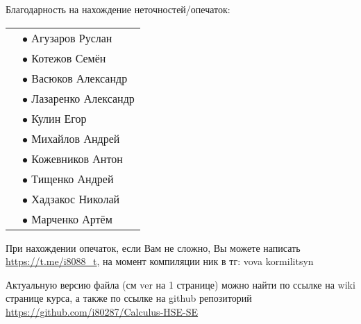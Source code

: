 Благодарность на нахождение неточностей/опечаток:

\begin{tabular}{rl}
    & $\bullet$ Агузаров Руслан \\
    & $\bullet$ Котежов Семён \\
    & $\bullet$ Васюков Александр \\
    & $\bullet$ Лазаренко Александр \\
    & $\bullet$ Кулин Егор \\
    & $\bullet$ Михайлов Андрей \\
    & $\bullet$ Кожевников Антон \\
    & $\bullet$ Тищенко Андрей \\
    & $\bullet$ Хадзакос Николай \\
    & $\bullet$ Марченко Артём \\
\end{tabular}

При нахождении опечаток, если Вам не сложно, Вы можете написать \url{https://t.me/i8088_t}, на момент компиляции ник в тг: vova kormilitsyn

Актуальную версию файла (см ver на 1 странице) можно найти по ссылке на wiki странице курса, 
а также по ссылке на github репозиторий \url{https://github.com/i80287/Calculus-HSE-SE}
